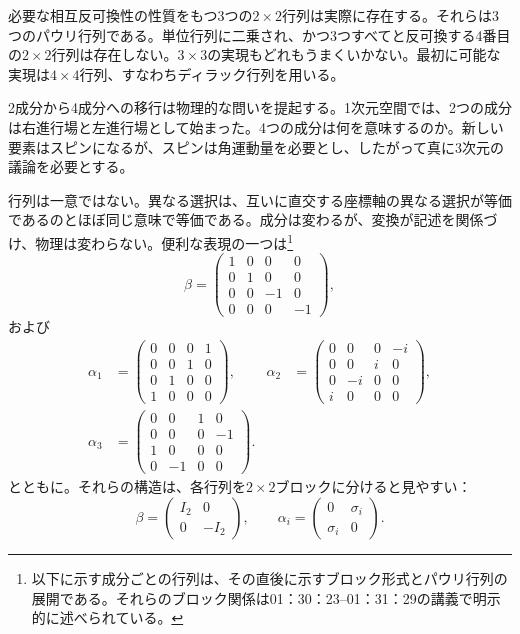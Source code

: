 必要な相互反可換性の性質をもつ3つの\(2\times2\)行列は実際に存在する。それらは3つのパウリ行列である。単位行列に二乗され、かつ3つすべてと反可換する4番目の\(2\times2\)行列は存在しない。\(3\times3\)の実現もどれもうまくいかない。最初に可能な実現は\(4\times4\)行列、すなわちディラック行列を用いる。

2成分から4成分への移行は物理的な問いを提起する。1次元空間では、2つの成分は右進行場と左進行場として始まった。4つの成分は何を意味するのか。新しい要素はスピンになるが、スピンは角運動量を必要とし、したがって真に3次元の議論を必要とする。

行列は一意ではない。異なる選択は、互いに直交する座標軸の異なる選択が等価であるのとほぼ同じ意味で等価である。成分は変わるが、変換が記述を関係づけ、物理は変わらない。便利な表現の一つは\footnote{以下に示す成分ごとの行列は、その直後に示すブロック形式とパウリ行列の展開である。それらのブロック関係は01：30：23--01：31：29の講義で明示的に述べられている。}
\begin{equation}
\beta=
\begin{pmatrix}
1&0&0&0\\
0&1&0&0\\
0&0&-1&0\\
0&0&0&-1
\end{pmatrix},
\end{equation}
および
\begin{align}
\alpha_1&=
\begin{pmatrix}
0&0&0&1\\
0&0&1&0\\
0&1&0&0\\
1&0&0&0
\end{pmatrix},
&
\alpha_2&=
\begin{pmatrix}
0&0&0&-i\\
0&0&i&0\\
0&-i&0&0\\
i&0&0&0
\end{pmatrix},
\\[1ex]
\alpha_3&=
\begin{pmatrix}
0&0&1&0\\
0&0&0&-1\\
1&0&0&0\\
0&-1&0&0
\end{pmatrix}.
\end{align}
とともに。それらの構造は、各行列を\(2\times2\)ブロックに分けると見やすい：
\begin{equation}
\beta=
\begin{pmatrix}
I_2&0\\
0&-I_2
\end{pmatrix},
\qquad
\alpha_i=
\begin{pmatrix}
0&\sigma_i\\
\sigma_i&0
\end{pmatrix}.
\end{equation}
